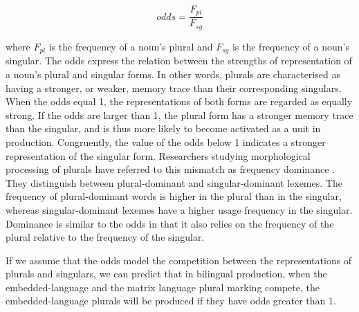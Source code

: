 \begin{equation*}
odds = \frac{F_{pl}}{F_{sg}}
\end{equation*}

\noindent where \(F_{pl}\) is the frequency of a noun’s plural and \(F_{sg}\) is the frequency of a noun’s singular. The odds express the relation between the strengths of representation of a noun’s plural and singular forms. In other words, plurals are characterised as having a stronger, or weaker, memory trace than their corresponding singulars. When the odds equal 1, the representations of both forms are regarded as equally strong. If the odds are larger than 1, the plural form has a stronger memory trace than the singular, and is thus more likely to become activated as a unit in production. Congruently, the value of the odds below 1 indicates a stronger representation of the singular form. Researchers studying morphological processing of plurals have referred to this mismatch as frequency dominance \citep{baayen-dijkstra-schreuder}. They distinguish between plural-dominant and singular-dominant lexemes. The frequency of plural-dominant words is higher in the plural than in the singular, whereas singular-dominant lexemes have a higher usage frequency in the singular. Dominance is similar to the odds in that it also relies on the frequency of the plural relative to the frequency of the singular.

If we assume that the odds model the competition between the representations of plurals and singulars, we can predict that in bilingual production, when the embedded-language and the matrix language plural marking compete, the embedded-language plurals will be produced if they have odds greater than 1.

